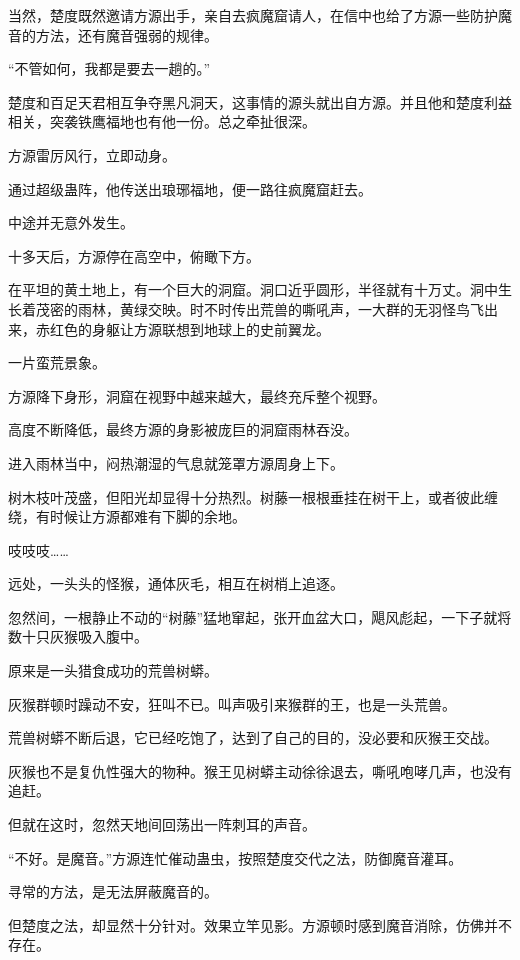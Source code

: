 
\begin{this_body}

当然，楚度既然邀请方源出手，亲自去疯魔窟请人，在信中也给了方源一些防护魔音的方法，还有魔音强弱的规律。

“不管如何，我都是要去一趟的。”

楚度和百足天君相互争夺黑凡洞天，这事情的源头就出自方源。并且他和楚度利益相关，突袭铁鹰福地也有他一份。总之牵扯很深。

方源雷厉风行，立即动身。

通过超级蛊阵，他传送出琅琊福地，便一路往疯魔窟赶去。

中途并无意外发生。

十多天后，方源停在高空中，俯瞰下方。

在平坦的黄土地上，有一个巨大的洞窟。洞口近乎圆形，半径就有十万丈。洞中生长着茂密的雨林，黄绿交映。时不时传出荒兽的嘶吼声，一大群的无羽怪鸟飞出来，赤红色的身躯让方源联想到地球上的史前翼龙。

一片蛮荒景象。

方源降下身形，洞窟在视野中越来越大，最终充斥整个视野。

高度不断降低，最终方源的身影被庞巨的洞窟雨林吞没。

进入雨林当中，闷热潮湿的气息就笼罩方源周身上下。

树木枝叶茂盛，但阳光却显得十分热烈。树藤一根根垂挂在树干上，或者彼此缠绕，有时候让方源都难有下脚的余地。

吱吱吱……

远处，一头头的怪猴，通体灰毛，相互在树梢上追逐。

忽然间，一根静止不动的“树藤”猛地窜起，张开血盆大口，飓风彪起，一下子就将数十只灰猴吸入腹中。

原来是一头猎食成功的荒兽树蟒。

灰猴群顿时躁动不安，狂叫不已。叫声吸引来猴群的王，也是一头荒兽。

荒兽树蟒不断后退，它已经吃饱了，达到了自己的目的，没必要和灰猴王交战。

灰猴也不是复仇性强大的物种。猴王见树蟒主动徐徐退去，嘶吼咆哮几声，也没有追赶。

但就在这时，忽然天地间回荡出一阵刺耳的声音。

“不好。是魔音。”方源连忙催动蛊虫，按照楚度交代之法，防御魔音灌耳。

寻常的方法，是无法屏蔽魔音的。

但楚度之法，却显然十分针对。效果立竿见影。方源顿时感到魔音消除，仿佛并不存在。


\end{this_body}
